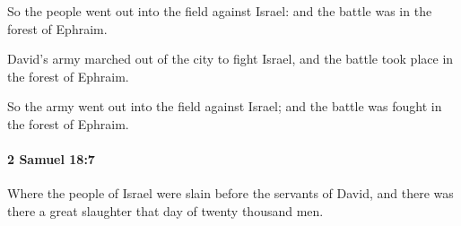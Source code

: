 			\begin{versebox}
					\item[BHS] 
					\item[ASV] So the people went out into the field against Israel: and the battle was in the forest of Ephraim.
					\item[NIV] David’s army marched out of the city to fight Israel, and the battle took place in the forest of Ephraim.
					\item[NRSV] So the army went out into the field against Israel; and the battle was fought in the forest of Ephraim.
			\end{versebox}

		\paragraph{2 Samuel 18:7} %
			\label{2SAMUEL-18-7}

			Where the people of Israel were slain before the servants of David, and there was there a great slaughter that day of twenty thousand men.

